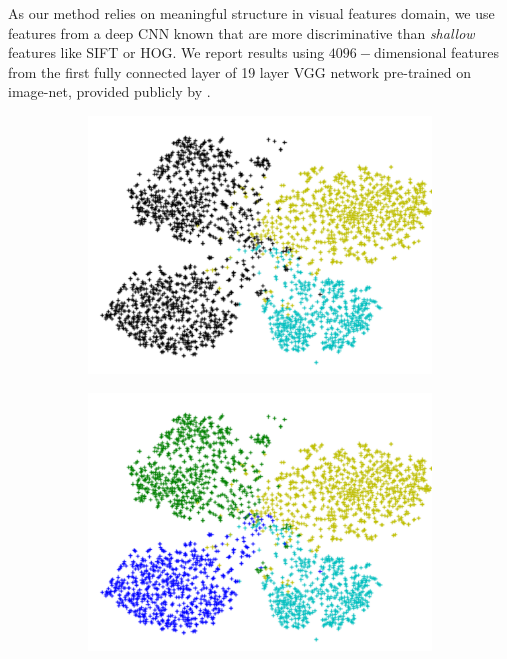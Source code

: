 \documentclass[letterpaper]{article}
\begin{document}
As our method relies on meaningful structure in visual features domain, we use features from a deep CNN known that are
 more discriminative than \textit{shallow} features like SIFT or HOG. We report results using
  $4096-$dimensional features from the first fully connected layer of 19 layer VGG network \cite{vgg}
pre-trained on image-net, provided publicly by \cite{sse}.
\begin{figure}[t]
  \centering
  \begin{subfigure}[b]{0.25\linewidth}
    \includegraphics[width=\linewidth]{none}
    \caption{}
    \label{fig:null}
  \end{subfigure}
%
  \begin{subfigure}[b]{0.25\linewidth}
    \includegraphics[width=\linewidth]{truth}

\end{subfigure}
\end{figure}
\end{document}
